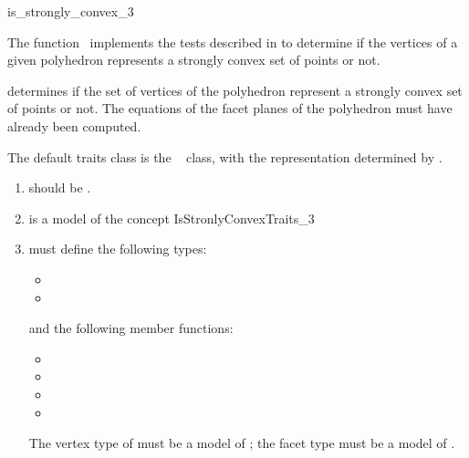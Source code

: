 \begin{ccRefFunction}{is_strongly_convex_3}

The function \ccRefName\ implements the tests described in 
\cite{mnssssu-cgpvg-96} to 
determine if the vertices of a given polyhedron represents a strongly convex 
set of points or not.  



{
determines if the set of vertices of the polyhedron  represent
a strongly convex set of points or not.
\ccPrecond%
The equations of the facet planes of the polyhedron must have
already been computed.
}

The default traits class is the \cgal\  class,%
with the representation determined by .

\begin{enumerate}
   \item {} should be .
   \item {} is a model of the concept IsStronlyConvexTraits\_3
  \item {} must define the following types:
        \begin{itemize}
          \item {}
          \item {}
        \end{itemize}
        and the following member functions:
        \begin{itemize}
          \item {}
          \item {}
          \item {}
          \item {}
        \end{itemize}
        The vertex type of  must be a model of 
        ;
        the facet type must be a model of .
\end{enumerate}


\ccSeeAlso

 \\
 \\

\end{ccRefFunction}
